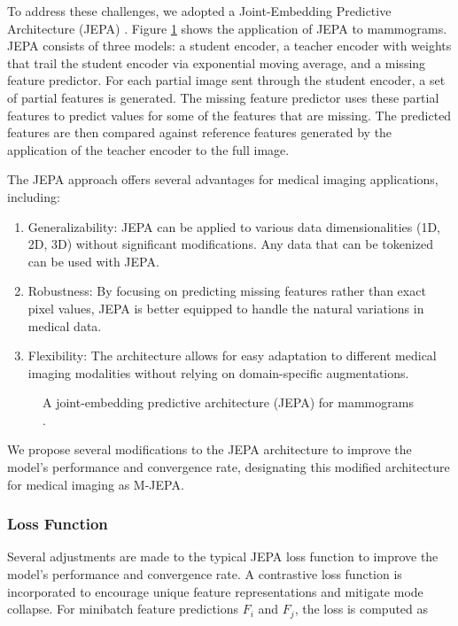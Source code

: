 \documentclass[12pt]{article}
\begin{document}
To address these challenges, we adopted a Joint-Embedding Predictive Architecture (JEPA) \cite{assran2023self}. 
Figure \ref{fig:jepa} shows the application of JEPA to mammograms.
JEPA consists of three models: a student encoder, a teacher encoder with weights that trail the student encoder via exponential moving average, and a missing feature predictor.
For each partial image sent through the student encoder, a set of partial features is generated.
The missing feature predictor uses these partial features to predict values for some of the
features that are missing.
The predicted features are then compared against reference features generated by the application of the teacher encoder to the full image.

The JEPA approach offers several advantages for medical imaging applications, including:
\begin{enumerate}
    \item Generalizability: JEPA can be applied to various data dimensionalities (1D, 2D, 3D) without significant modifications.
      Any data that can be tokenized can be used with JEPA.
    \item Robustness: By focusing on predicting missing features rather than exact pixel values, JEPA is better equipped to handle the natural variations in medical data.
    \item Flexibility: The architecture allows for easy adaptation to different medical imaging modalities without relying on domain-specific augmentations.
\end{enumerate}

\begin{figure}
  \centering
  
  \caption{A joint-embedding predictive architecture (JEPA) for mammograms \cite{assran2023self}.}
  \label{fig:jepa}
\end{figure}


We propose several modifications to the JEPA architecture to improve the model's performance and convergence rate, designating this modified architecture for medical imaging as M-JEPA.

\subsubsection{Loss Function}

Several adjustments are made to the typical JEPA loss function to improve the model's performance and convergence rate. 
A contrastive loss function is incorporated to encourage unique feature representations and mitigate mode collapse.
For minibatch feature predictions $F_i$ and $F_j$, the loss is computed as
\end{document}
